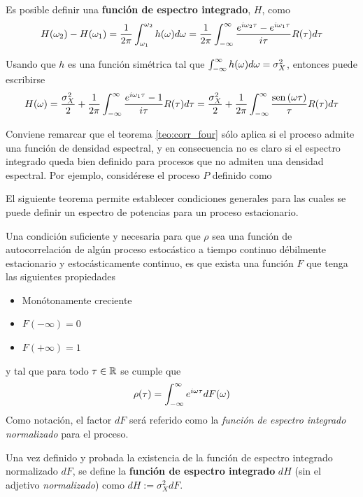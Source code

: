 Es posible definir una \textbf{función de espectro integrado}, $H$, como
\begin{equation}
H(\omega_2) - H(\omega_1) = \frac{1}{2 \pi} \int_{\omega_1}^{\omega_2} h(\omega) d\omega =
\frac{1}{2\pi} \int_{-\infty}^{\infty} \frac{e^{i \omega_2 \tau}-e^{i \omega_1 \tau}}{i \tau} R(\tau) d\tau
\end{equation}

Usando que $h$ es una función simétrica tal que $\int_{-\infty}^{\infty} h(\omega) d\omega = \sigma_X^{2}$, entonces puede escribirse
\begin{equation}
H(\omega) = \frac{\sigma_X^{2}}{2} + \frac{1}{2 \pi} \int_{-\infty}^{\infty} \frac{e^{i \omega_1 \tau}-1}{i \tau} R(\tau) d\tau = \frac{\sigma_X^{2}}{2} + \frac{1}{2 \pi} \int_{-\infty}^{\infty} \frac{\mathrm{sen}\left( \omega \tau \right)}{\tau} R(\tau) d\tau
\end{equation}

Conviene remarcar que el teorema \ref{teo:corr_four} sólo aplica si el proceso admite una función de densidad espectral, y en consecuencia no es claro si el espectro integrado queda bien definido para procesos que no admiten una densidad espectral. 
%
Por ejemplo, considérese el proceso $P$ definido como 

El siguiente teorema permite establecer condiciones generales para las cuales se puede definir un espectro de potencias para un proceso estacionario.

\begin{teorema}
Una condición suficiente y necesaria para que $\rho$ sea una función de autocorrelación de 
algún proceso estocástico a tiempo continuo \xt débilmente estacionario y 
estocásticamente continuo, es que exista una función $F$ que tenga las siguientes propiedades
\begin{itemize}
\item Monótonamente creciente
\item $F(-\infty) = 0$
\item $F(+\infty) = 1$
\end{itemize}
y tal que para todo $\tau \in \mathbb{R}$ se cumple que
\begin{equation*}
\rho(\tau) = \int_{-\infty}^{\infty} e^{i \omega \tau} dF(\omega)
\end{equation*}
Como notación, el factor $dF$ será referido como la \textit{función de espectro integrado normalizado} para el proceso.
\label{t_wienerkhinchin}
\end{teorema}

Una vez definido y probada la existencia de la función de espectro integrado normalizado $dF$, se define la \textbf{función de espectro integrado} $dH$ (sin el adjetivo \textit{normalizado}) como
$dH := \sigma_X^{2} dF$.

